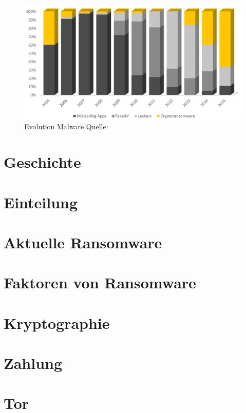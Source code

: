 \documentclass[runningheads,a4paper]{llncs}
\begin{document}
	\begin{figure}[h!]
		\centering
		\includegraphics[width=\linewidth]{img/ransom-evolution.png}
		\caption{Evolution Malware Quelle: \cite{evolution}}
		\label{fig:ransom-evo}
	\end{figure}

\section{Geschichte}


\section{Einteilung}


\section{Aktuelle Ransomware}


\section{Faktoren von Ransomware}


\section{Kryptographie}


\section{Zahlung}


\section{Tor}

\end{document}
